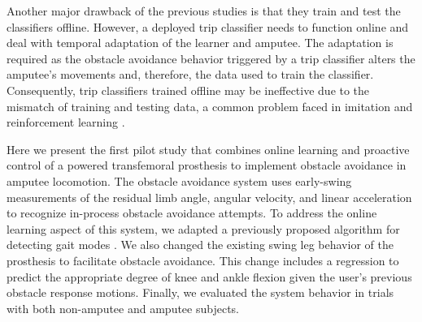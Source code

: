 Another major drawback of the previous studies is that they train and test the
classifiers offline. However, a deployed trip classifier needs to function
online and deal with temporal adaptation of the learner and amputee. The
adaptation is required as the obstacle avoidance behavior triggered by a trip
classifier alters the amputee's movements and, therefore, the data used to train
the classifier. Consequently, trip classifiers trained offline may be
ineffective due to the mismatch of training and testing data, a common problem
faced in imitation and reinforcement learning \citep{ross2011reduction}. 

Here we present the first pilot study that combines online learning and
proactive control of a powered transfemoral prosthesis to implement obstacle
avoidance in amputee locomotion. The obstacle avoidance system uses early-swing
measurements of the residual limb angle, angular velocity, and linear
acceleration to recognize in-process obstacle avoidance attempts. To address the
online learning aspect of this system, we adapted a previously proposed
algorithm for detecting gait modes \citep{spanias2018online}. We also changed
the existing swing leg behavior of the prosthesis to facilitate obstacle
avoidance. This change includes a regression to predict the appropriate degree
of knee and ankle flexion given the user's previous obstacle response motions.
Finally, we evaluated the system behavior in trials with both non-amputee and
amputee subjects.
